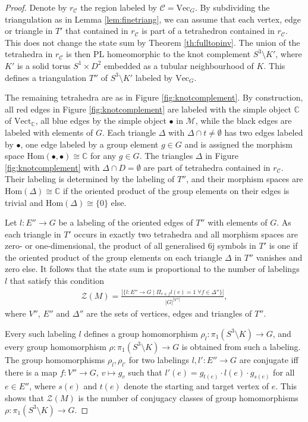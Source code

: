 \documentclass[1.5pt, a4paper]{article}
\newcommand{\C}{\mathbb{C}}
\newcommand{\mac}{\mathcal C}
\newcommand{\mam}{\mathcal M}
\newcommand{\Hom}{\mathrm{Hom}}
\begin{document}
 \begin{proof} Denote by $r_\mac$ the region labeled by $\mac=\mathrm{Vec}_G$.
  By subdividing the triangulation as in Lemma \ref{lem:finetriang}, 
 we can assume that each  vertex, edge or triangle in $T'$ that contained in  $r_\mac$  is part of a tetrahedron contained in $r_\mac$. This does not change the state sum by Theorem \ref{th:fulltopinv}. 
The union of the tetrahedra  in $r_\mac$ is then PL homeomorphic to the knot complement $S^3\setminus K'$, where $K'$ is a solid torus $S^1\times D^2$ embedded as a tubular neighbourhood of $K$. This defines a triangulation $T''$ of $S^3\setminus K'$ labeled by $\mathrm{Vec}_G$. 
 

The remaining tetrahedra are as in Figure \ref{fig:knotcomplement}. By construction, all red edges in Figure \ref{fig:knotcomplement} are labeled with the simple object $\C$ of $\mathrm{Vect}_\C$, all blue edges by the simple object $\bullet$ in $\mam$, while the black edges are labeled with elements of $G$.   Each triangle $\Delta$ with $\Delta\cap t\neq \emptyset$ has two edges labeled by $\bullet$, one edge labeled by a group element $g\in G$ and is assigned the morphism space $\Hom(\bullet, \bullet)\cong \C$ for any $g\in G$. The triangles $\Delta$ in Figure \ref{fig:knotcomplement} with $\Delta\cap D=\emptyset$ are part of tetrahedra contained in $r_\mac$. Their labeling is determined by the labeling of $T''$, and their morphism spaces are $\Hom(\Delta)\cong \C$ if the oriented product of the group elements on their edges
 is trivial and $\Hom(\Delta)\cong \{0\}$ else.  
 
 Let $l: E''\to G$ be a labeling  of the oriented edges of $T''$ with elements of $G$.  
 As each triangle in $T'$ occurs in exactly two tetrahedra and all morphism spaces are zero- or one-dimensional,  the product of all generalised 6j symbols in $T'$ is one if the oriented product of the group elements on each triangle $\Delta$ in $T''$ vanishes and zero else. It follows that the state sum is  proportional to  the number of labelings $l$ that satisfy this condition
\begin{align}
\label{eq:statesumknotcomp}
\mathcal Z(M)=\frac { |\{l: E''\to G\mid \Pi_{e\in f}l(e)=1\;\forall f\in \Delta'' \}|} {|G|^{|V''|}},
\end{align}
 where $V''$, $E''$ and $\Delta''$ are the sets of vertices, edges and triangles of $T''$.
 
 Every such  labeling $l$  defines a group homomorphism $\rho_l:\pi_1(S^3\setminus K)\to G$, and every group homomorphism $\rho:\pi_1(S^3\setminus K)\to G$ is obtained from such a labeling.  The group homomorphisms $\rho_l,\rho_{l'}$ for two labelings $l,l': E''\to G$ are conjugate  iff there is a map $f: V''\to G$, $v\mapsto g_v$ such that
$l'(e)=g_{t(e)}\cdot l(e)\cdot g_{s(e)}$  for all $e\in E''$, where $s(e)$ and $t(e)$ denote the starting and target vertex of  $e$. 
This shows that $\mathcal Z(M)$ is the number of conjugacy classes of group homomorphisms $\rho:\pi_1(S^3\setminus K)\to G$. 
 \end{proof}
 
\end{document}
